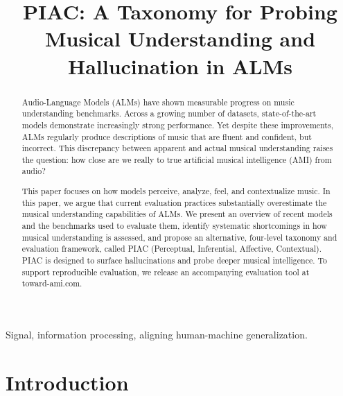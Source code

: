 \documentclass[conference,a4paper]{APSIPA2026}
\begin{document}
\title{PIAC: A Taxonomy for Probing Musical Understanding and Hallucination in ALMs}

\author{


}

\maketitle
\thispagestyle{firststyle}
\pagestyle{empty}

\begin{abstract}
Audio-Language Models (ALMs) have shown measurable progress on music understanding benchmarks. Across a growing number of datasets, state-of-the-art models demonstrate increasingly strong performance. Yet despite these improvements, ALMs regularly produce descriptions of music that are fluent and confident, but incorrect. This discrepancy between apparent and actual musical understanding raises the question: how close are we really to true artificial musical intelligence (AMI) from audio? 

This paper focuses on how models perceive, analyze, feel, and contextualize music. In this paper, we argue that current evaluation practices substantially overestimate the musical understanding capabilities of ALMs. We present an overview of recent models and the benchmarks used to evaluate them, identify systematic shortcomings in how musical understanding is assessed, and propose an alternative, four-level taxonomy and evaluation framework, called PIAC (Perceptual, Inferential, Affective, Contextual). PIAC is designed to surface hallucinations and probe deeper musical intelligence. To support reproducible evaluation, we release an accompanying evaluation tool at toward-ami.com.
\end{abstract}

\begin{IEEEkeywords}
  Signal, information processing, aligning human-machine generalization. 
\end{IEEEkeywords} 

\section{Introduction}
\end{document}
